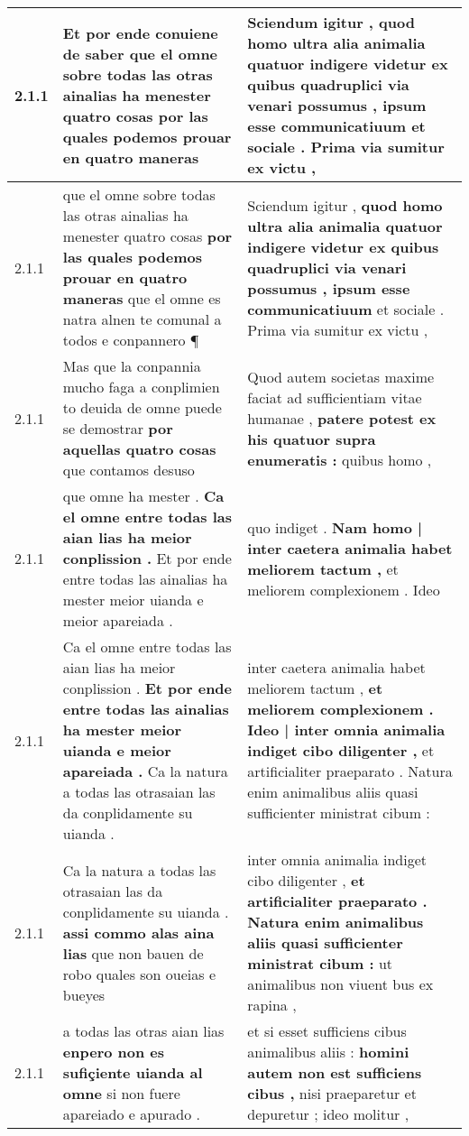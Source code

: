 \begin{tabular}{|p{1cm}|p{6.5cm}|p{6.5cm}|}
2.1.1 & Et por ende conuiene de saber \textbf{ que el omne sobre todas las otras ainalias ha menester quatro cosas } por las quales podemos prouar en quatro maneras & Sciendum igitur , \textbf{ quod homo ultra alia animalia quatuor indigere videtur ex quibus quadruplici via venari possumus , ipsum esse communicatiuum } et sociale . Prima via sumitur ex victu , \\\hline
2.1.1 & que el omne sobre todas las otras ainalias ha menester quatro cosas \textbf{ por las quales podemos prouar en quatro maneras } que el omne es natra alnen te comunal a todos e conpannero ¶ & Sciendum igitur , \textbf{ quod homo ultra alia animalia quatuor indigere videtur ex quibus quadruplici via venari possumus , ipsum esse communicatiuum } et sociale . Prima via sumitur ex victu , \\\hline
2.1.1 & Mas que la conpannia mucho faga a conplimien to deuida de omne puede se demostrar \textbf{ por aquellas quatro cosas } que contamos desuso & Quod autem societas maxime faciat ad sufficientiam vitae humanae , \textbf{ patere potest ex his quatuor supra enumeratis : } quibus homo , \\\hline
2.1.1 & que omne ha mester . \textbf{ Ca el omne entre todas las aian lias ha meior conplission . } Et por ende entre todas las ainalias ha mester meior uianda e meior apareiada . & quo indiget . \textbf{ Nam homo | inter caetera animalia habet meliorem tactum , } et meliorem complexionem . Ideo \\\hline
2.1.1 & Ca el omne entre todas las aian lias ha meior conplission . \textbf{ Et por ende entre todas las ainalias ha mester meior uianda e meior apareiada . } Ca la natura a todas las otrasaian las da conplidamente su uianda . & inter caetera animalia habet meliorem tactum , \textbf{ et meliorem complexionem . Ideo | inter omnia animalia indiget cibo diligenter , } et artificialiter praeparato . Natura enim animalibus aliis quasi sufficienter ministrat cibum : \\\hline
2.1.1 & Ca la natura a todas las otrasaian las da conplidamente su uianda . \textbf{ assi commo alas aina lias } que non bauen de robo quales son oueias e bueyes & inter omnia animalia indiget cibo diligenter , \textbf{ et artificialiter praeparato . Natura enim animalibus aliis quasi sufficienter ministrat cibum : } ut animalibus non viuent bus ex rapina , \\\hline
2.1.1 & a todas las otras aian lias \textbf{ enpero non es sufiçiente uianda al omne } si non fuere apareiado e apurado . & et si esset sufficiens cibus animalibus aliis : \textbf{ homini autem non est sufficiens cibus , } nisi praeparetur et depuretur ; ideo molitur , \\\hline

\end{tabular}
